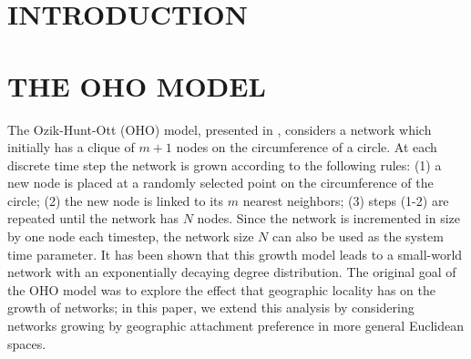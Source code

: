\documentclass[aps,pre,reprint,superscriptaddress,amsmath,amssymb]{revtex4-1}
\begin{document}

\maketitle

\section{INTRODUCTION}

\section{THE OHO MODEL}
The Ozik-Hunt-Ott (OHO) model, presented in \cite{ozik2004}, considers a network which initially has a clique of $m+1$ nodes on the circumference of a circle. 
At each discrete time step the network is grown according to the following rules: 
(1) a new node is placed at a randomly selected point on the circumference of the circle;
(2) the new node is linked to its $m$ nearest neighbors;
(3) steps (1-2) are repeated until the network has $N$ nodes.
Since the network is incremented in size by one node each timestep, the network size $N$ can also be used as the system time parameter.  
It has been shown \cite{ozik2004} that this growth model leads to a small-world network with an exponentially decaying degree distribution. 
The original goal of the OHO model was to explore the effect that geographic locality has on the growth of networks; in this paper, we extend this analysis by considering networks growing by geographic attachment preference in more general Euclidean spaces. 
\end{document}
